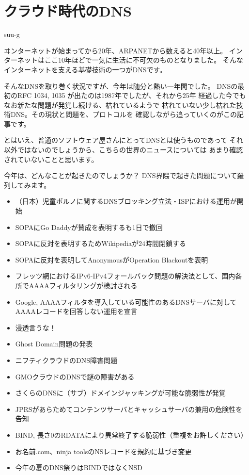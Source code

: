 
\cleardoublepage
\plainifnotempty

\chapter{クラウド時代のDNS}
\begin{flushright}
suu-g
\end{flushright}

\lettrine{ヰ}
ンターネットが始まってから20年、ARPANETから数えると40年以上。
インターネットはここ10年ほどで一気に生活に不可欠のものとなりました。
そんなインターネットを支える基礎技術の一つがDNSです。

そんなDNSを取り巻く状況ですが、今年は随分と熱い一年間でした。
DNSの最初のRFC 1034, 1035 が出たのは1987年でしたが、それから25年
経過した今でもなお新たな問題が発覚し続ける、枯れているようで
枯れていない少し枯れた技術DNS。その現状と問題を、プロトコルを
確認しながら追っていくのがこの記事です。

とはいえ、普通のソフトウェア屋さんにとってDNSとは使うものであって
それ以外ではないのでしょうから、こちらの世界のニュースについては
あまり確認されていないことと思います。

今年は、どんなことが起きたのでしょうか？
DNS界隈で起きた問題について羅列してみます。
\begin{itemize}
  \item （日本）児童ポルノに関するDNSブロッキング立法・ISPにおける運用が開始
  \item SOPAにGo Daddyが賛成を表明するも1日で撤回
  \item SOPAに反対を表明するためWikipediaが24時間閉鎖する
  \item SOPAに反対を表明してAnonymousがOperation Blackoutを表明
  \item フレッツ網におけるIPv6-IPv4フォールバック問題の解決法として、国内各所でAAAAフィルタリングが検討される
  \item Google, AAAAフィルタを導入している可能性のあるDNSサーバに対してAAAAレコードを回答しない運用を宣言
  \item 浸透言うな！
  \item Ghost Domain問題の発表
  \item ニフティクラウドのDNS障害問題
  \item GMOクラウドのDNSで謎の障害がある
  \item さくらのDNSに（サブ）ドメインジャッキングが可能な脆弱性が発覚
  \item JPRSがあらためてコンテンツサーバとキャッシュサーバの兼用の危険性を告知
  \item BIND, 長さ0のRDATAにより異常終了する脆弱性（重複をお許しください）
  \item お名前.com、ninja toolsのNSレコードを規約に基づき変更
  \item 今年の夏のDNS祭りはBINDではなくNSD
\end{itemize}

